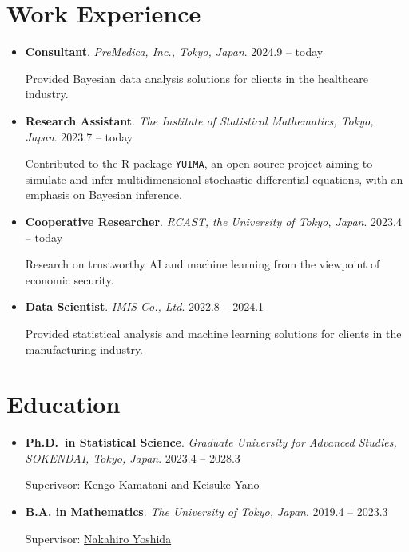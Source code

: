 \documentclass[
  11pt,
]{article}
\renewcommand{\labelitemi}{\textcolor{minty}{\faCheckCircle}} %
\begin{document}
\section{Work Experience}\label{work-experience}

\renewcommand{\labelitemi}{\textcolor{minty}{\faUniversity}}

\begin{itemize}
\item
  \textbf{Consultant}. \emph{PreMedica, Inc., Tokyo, Japan}.
  \hfill {2024.9 -- today}

  Provided Bayesian data analysis solutions for clients in the
  healthcare industry.
\item
  \textbf{Research Assistant}. \emph{The Institute of Statistical
  Mathematics, Tokyo, Japan}. \hfill {2023.7 -- today}

  Contributed to the R package \texttt{YUIMA}, an open-source project
  aiming to simulate and infer multidimensional stochastic differential
  equations, with an emphasis on Bayesian inference.
\item
  \textbf{Cooperative Researcher}. \emph{RCAST, the University of Tokyo,
  Japan}. \hfill {2023.4 -- today}

  Research on trustworthy AI and machine learning from the viewpoint of
  economic security.
\item
  \textbf{Data Scientist}. \emph{IMIS Co., Ltd}. \hfill {2022.8 --
  2024.1}

  Provided statistical analysis and machine learning solutions for
  clients in the manufacturing industry.
\end{itemize}

\section{Education}\label{education}

\renewcommand{\labelitemi}{\textcolor{minty}{\faGraduationCap}}

\begin{itemize}
\item
  \textbf{Ph.D.~in Statistical Science}. \emph{Graduate University for
  Advanced Studies, SOKENDAI, Tokyo, Japan}. \hfill {2023.4 -- 2028.3}

  Superivsor:
  \href{https://sites.google.com/view/kengokamatani/home}{Kengo
  Kamatani} and \href{https://sites.google.com/site/kyanostat/}{Keisuke
  Yano}
\item
  \textbf{B.A. in Mathematics}. \emph{The University of Tokyo, Japan}.
  \hfill {2019.4 -- 2023.3}

  Supervisor:
  \href{https://www.ms.u-tokyo.ac.jp/~nakahiro/hp-naka-e}{Nakahiro
  Yoshida}
\end{itemize}
\end{document}
